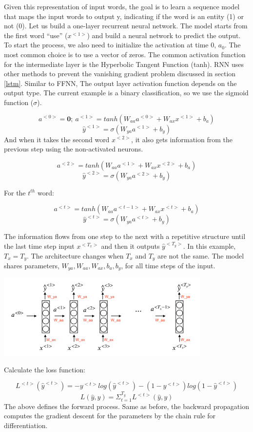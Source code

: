 \documentclass[
  12pt,
]{krantz}
\begin{document}
Given this representation of input words, the goal is to learn a sequence model that maps the input words to output y, indicating if the word is an entity (1) or not (0). Let us build a one-layer recurrent neural network. The model starts from the first word ``use'' (\(x^{<1>}\)) and build a neural network to predict the output. To start the process, we also need to initialize the activation at time 0, \(a_0\). The most common choice is to use a vector of zeros. The common activation function for the intermediate layer is the Hyperbolic Tangent Function (tanh). RNN uses other methods to prevent the vanishing gradient problem discussed in section \ref{lstm}. Similar to FFNN, The output layer activation function depends on the output type. The current example is a binary classification, so we use the sigmoid function (\(\sigma\)).

\[a^{<0>} = \mathbf{0};\ a^{<1>} = tanh(W_{aa}a^{<0>} + W_{ax}x^{<1>}+b_a)\]
\[\hat{y}^{<1>} = \sigma(W_{ya}a^{<1>}+b_y)\]
And when it takes the second word \(x^{<2>}\), it also gets information from the previous step using the non-activated neurons.

\[a^{<2>} = tanh(W_{aa}a^{<1>}+W_{ax}x^{<2>}+b_a)\]
\[\hat{y}^{<2>} = \sigma(W_{ya}a^{<2>}+b_y)\]

For the \(t^{th}\) word:

\[a^{<t>} = tanh(W_{aa}a^{<t-1>}+W_{ax}x^{<t>}+b_a)\]
\[\hat{y}^{<t>} = \sigma(W_{ya}a^{<t>}+b_y)\]

The information flows from one step to the next with a repetitive structure until the last time step input \(x^{<T_x>}\) and then it outputs \(\hat{y}^{<T_y>}\). In this example, \(T_x = T_y\). The architecture changes when \(T_x\) and \(T_y\) are not the same. The model shares parameters, \(W_{ya}, W_{aa}, W_{ax},b_a, b_y\), for all time steps of the input.

\includegraphics[width=0.8\textwidth,height=\textheight]{images/RNN_pro.png}

Calculate the loss function:

\[L^{<t>}(\hat{y}^{<t>}) = -y^{<t>}log(\hat{y}^{<t>})-(1-y^{<t>})log(1-\hat{y}^{<t>})\]
\[L(\hat{y},y)=\Sigma_{t=1}^{T_y}L^{<t>}(\hat{y},y)\]
The above defines the forward process. Same as before, the backward propagation computes the gradient descent for the parameters by the chain rule for differentiation.
\end{document}
